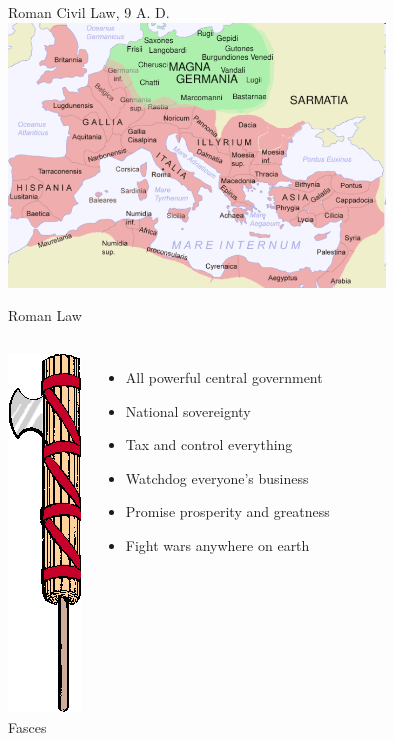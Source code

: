 \documentclass{beamer}
\begin{document}
\begin{frame}{Roman Civil Law, 9 A. D.}
    \centering
    \includegraphics[width=0.75\textwidth]{img/europe-map.png} \\
\end{frame}

\begin{frame}{Roman Law}
    \begin{columns}[onlytextwidth]
            \centering
            \includegraphics[height=0.55\textheight]{img/fasces.png} \\
            Fasces \\

            \begin{itemize}
                \item All powerful central government
                \item National sovereignty
                \item Tax and control everything
                \item Watchdog everyone's business
                \item Promise prosperity and greatness
                \item Fight wars anywhere on earth
            \end{itemize}
    \end{columns}
\end{frame}
\end{document}
